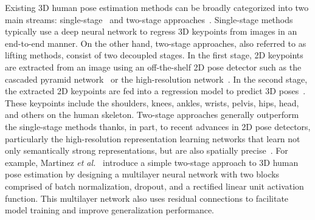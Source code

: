 \documentclass[10pt,journal]{IEEEtran}
\begin{document}
Existing 3D human pose estimation methods can be broadly categorized into two main streams: single-stage~\cite{li20143d} and two-stage approaches~\cite{pavlakos2017coarse,sun2017compositional}. Single-stage methods typically use a deep neural network to regress 3D keypoints from images in an end-to-end manner. On the other hand, two-stage approaches, also referred to as lifting methods, consist of two decoupled stages. In the first stage, 2D keypoints are extracted from an image using an off-the-shelf 2D pose detector such as the cascaded pyramid network~\cite{chen2018cascaded} or the high-resolution network~\cite{sun2019deep}. In the second stage, the extracted 2D keypoints are fed into a regression model to predict 3D poses~\cite{martinez2017simple,yang20183d,fang2018learning,rayat2018exploiting,pavlakos2018ordinal,sharma2019monocular}. These keypoints include the shoulders, knees, ankles, wrists, pelvis, hips, head, and others on the human skeleton. Two-stage approaches generally outperform the single-stage methods thanks, in part, to recent advances in 2D pose detectors, particularly the high-resolution representation learning networks that learn not only semantically strong representations, but are also spatially precise~\cite{sun2019deep}. For example, Martinez \textit{et al.}~\cite{martinez2017simple} introduce a simple two-stage approach to 3D human pose estimation by designing a multilayer neural network with two blocks comprised of batch normalization, dropout, and a rectified linear unit activation function. This multilayer network also uses residual connections to facilitate model training and improve generalization performance.
	
\end{document}
